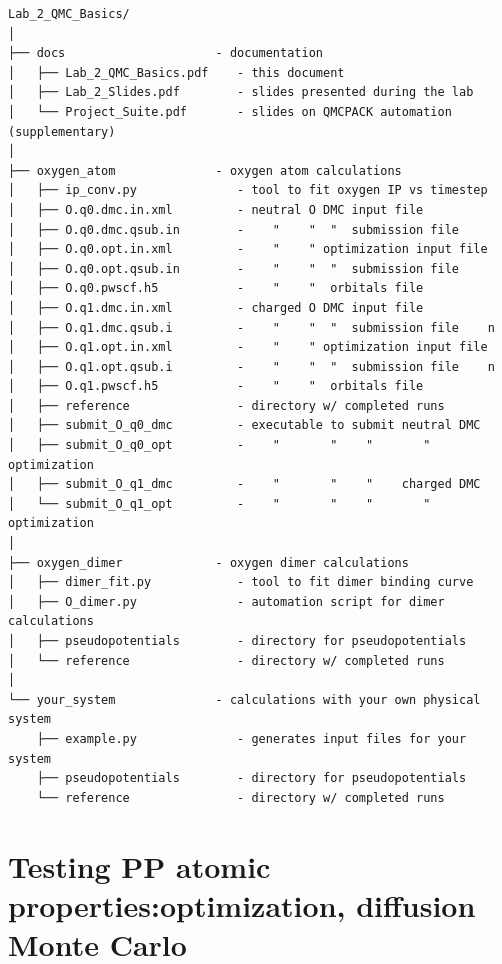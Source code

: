 \begin{shaded}
\begin{verbatim}
Lab_2_QMC_Basics/
│
├── docs                     - documentation 
│   ├── Lab_2_QMC_Basics.pdf    - this document
│   ├── Lab_2_Slides.pdf        - slides presented during the lab
│   └── Project_Suite.pdf       - slides on QMCPACK automation (supplementary)
│
├── oxygen_atom              - oxygen atom calculations 
│   ├── ip_conv.py              - tool to fit oxygen IP vs timestep
│   ├── O.q0.dmc.in.xml         - neutral O DMC input file
│   ├── O.q0.dmc.qsub.in        -    "    "  "  submission file
│   ├── O.q0.opt.in.xml         -    "    " optimization input file
│   ├── O.q0.opt.qsub.in        -    "    "  "  submission file         
│   ├── O.q0.pwscf.h5           -    "    "  orbitals file         
│   ├── O.q1.dmc.in.xml         - charged O DMC input file         
│   ├── O.q1.dmc.qsub.i         -    "    "  "  submission file    n
│   ├── O.q1.opt.in.xml         -    "    " optimization input file
│   ├── O.q1.opt.qsub.i         -    "    "  "  submission file    n
│   ├── O.q1.pwscf.h5           -    "    "  orbitals file         
│   ├── reference               - directory w/ completed runs
│   ├── submit_O_q0_dmc         - executable to submit neutral DMC
│   ├── submit_O_q0_opt         -    "       "    "       "    optimization
│   ├── submit_O_q1_dmc         -    "       "    "    charged DMC
│   └── submit_O_q1_opt         -    "       "    "       "    optimization
│
├── oxygen_dimer             - oxygen dimer calculations
│   ├── dimer_fit.py            - tool to fit dimer binding curve
│   ├── O_dimer.py              - automation script for dimer calculations
│   ├── pseudopotentials        - directory for pseudopotentials
│   └── reference               - directory w/ completed runs
│
└── your_system              - calculations with your own physical system
    ├── example.py              - generates input files for your system
    ├── pseudopotentials        - directory for pseudopotentials
    └── reference               - directory w/ completed runs
\end{verbatim}
\end{shaded}




\section{Testing PP atomic properties:\newline optimization, diffusion Monte Carlo}


